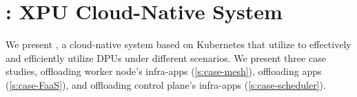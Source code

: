 \section{\sys: XPU Cloud-Native System}
\label{s:case}

We present \sys, a cloud-native system based on Kubernetes that utilize \os to effectively and efficiently utilize DPUs under different scenarios.
We present three case studies,
offloading worker node's infra-apps (\textsection\ref{s:case-mesh}),
offloading apps (\textsection\ref{s:case-FaaS}),
and offloading control plane's infra-apps (\textsection\ref{s:case-scheduler}).




